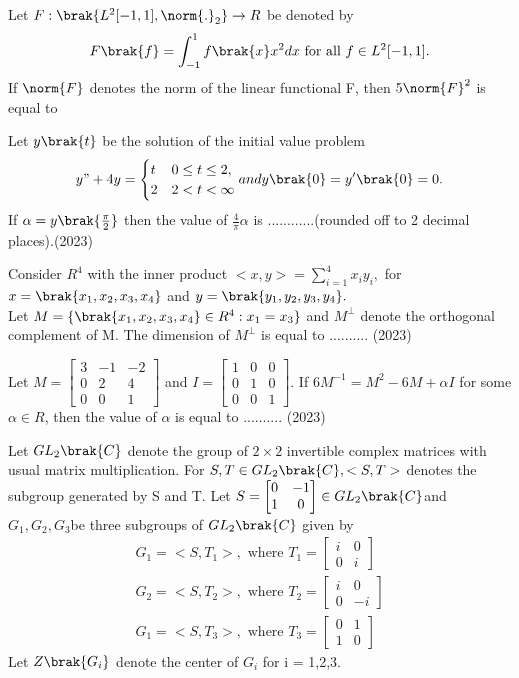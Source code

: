     Let $F:\brak{L^2[-1,1],\norm{.}_2}\to R$ be denoted by $$F\brak{f} = \int_{-1}^{1}f\brak{x}x^2dx\text{  for all }f\in L^2[-1,1].$$ If $\norm{F}$ denotes the norm of the linear functional F, then $5\norm{F}^2$ is equal to 
    \item Let $y\brak{t}$ be the solution of the initial value problem $$y"+4y = \begin{cases}t&0\leq t\leq 2,\\2&2<t<\infty \end{cases} and y\brak{0} = y'\brak{0} = 0.$$ If $\alpha = y\brak{\frac{\pi}{2}}$ then the value of $\frac{4}{\pi}\alpha$ is ............(rounded off to 2 decimal places).\hfill (2023)
    \item Consider $R^4$ with the inner product $<x,y> = \sum_{i=1}^{4}x_iy_i,$ for $x = \brak{x_1, x_2, x_3, x_4}$ and $y = \brak{y_1, y_2, y_3, y_4}.$\\Let $M = \{\brak{x_1, x_2, x_3, x_4}\in R^4 : x_1=x_3\}$ and $M^\bot$ denote the orthogonal complement of M. The dimension of $M^{\bot}$ is equal to .......... \hfill (2023)
    \item Let $M = \begin{bmatrix}3&-1&-2\\0&2&4\\0&0&1\end{bmatrix}$ and $I = \begin{bmatrix}1&0&0\\0&1&0\\0&0&1\end{bmatrix}$. If $6M^{-1} = M^2 - 6M + \alpha I$ for some $\alpha \in R$, then the value of $\alpha$ is equal to .......... \hfill (2023)
    \item Let $GL_2\brak{C}$ denote the group of $2 \times 2$ invertible complex matrices with usual
    matrix multiplication. For $S, T \in GL_2\brak{C}, < S, T >$ denotes the subgroup generated by S and T. Let $S = \begin{bmatrix}0&-1\\1&0\end{bmatrix} \in GL_2\brak{C}$and $G_1, G_2, G_3$be three
    subgroups of $GL_2\brak{C}$ given by\\
    \begin{align*}
        G_1 = <S,T_1>, \text{ where }T_1 = \begin{bmatrix}i&0\\0&i\end{bmatrix} \\
        G_2 = <S,T_2>, \text{ where }T_2 = \begin{bmatrix}i&0\\0&-i\end{bmatrix}\\
        G_1 = <S,T_3>, \text{ where }T_3 = \begin{bmatrix}0&1\\1&0\end{bmatrix}
    \end{align*}
    Let $Z\brak{G_i}$ denote  the center of $G_i$ for i = 1,2,3.
    
